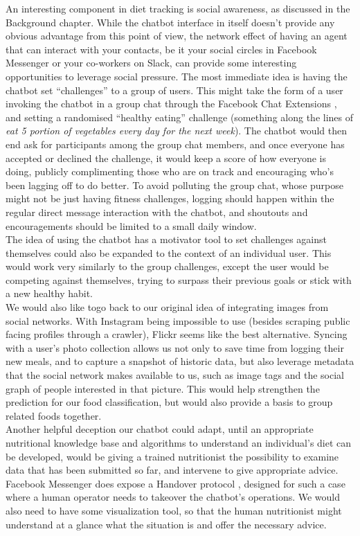 An interesting component in diet tracking is social awareness, as discussed in the Background chapter. While the chatbot interface in itself doesn't provide any obvious advantage from this point of view, the network effect of having an agent that can interact with your contacts, be it your social circles in Facebook Messenger or your co-workers on Slack, can provide some interesting opportunities to leverage social pressure. The most immediate idea is having the chatbot set ``challenges'' to a group of users. This might take the form of a user invoking the chatbot in a group chat through the Facebook Chat Extensions \cite{chatextentions}, and setting a randomised ``healthy eating'' challenge (something along the lines of \textit{eat 5 portion of vegetables every day for the next week}). The chatbot would then end ask for participants among the group chat members, and once everyone has accepted or declined the challenge, it would keep a score of how everyone is doing, publicly complimenting those who are on track and encouraging who's been lagging off to do better. To avoid polluting the group chat, whose purpose might not be just having fitness challenges, logging should happen within the regular direct message interaction with the chatbot, and shoutouts and encouragements should be limited to a small daily window. \\
The idea of using the chatbot has a motivator tool to set challenges against themselves could also be expanded to the context of an individual user. This would work very similarly to the group challenges, except the user would be competing against themselves, trying to surpass their previous goals or stick with a new healthy habit. \\
We would also like togo back to our original idea of integrating images from social networks. With Instagram being impossible to use (besides scraping public facing profiles through a crawler), Flickr seems like the best alternative. Syncing with a user's photo collection allows us not only to save time from logging their new meals, and to capture a snapshot of historic data, but also leverage metadata that the social network makes available to us, such as image tags and the social graph of people interested in that picture. This would help strengthen the prediction for our food classification, but would also provide a basis to group related foods together. \\
Another helpful deception our chatbot could adapt, until an appropriate nutritional knowledge base and algorithms to understand an individual's diet can be developed, would be giving a trained nutritionist the possibility to examine data that has been submitted so far, and intervene to give appropriate advice. Facebook Messenger does expose a Handover protocol \cite{}, designed for such a case where a human operator needs to takeover the chatbot's operations. We would also need to have some visualization tool, so that the human nutritionist might understand at a glance what the situation is and offer the necessary advice.


